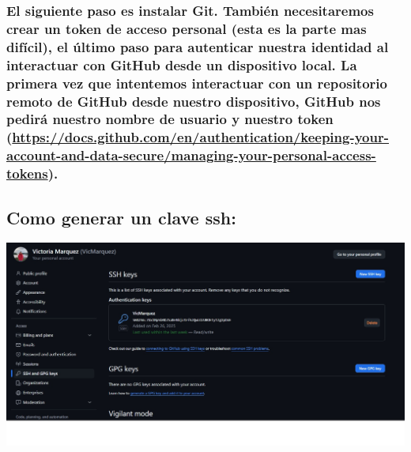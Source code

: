 \documentclass[
]{article}
\begin{document}
\subsubsection{\texorpdfstring{El siguiente paso es instalar Git.
También necesitaremos crear un token de acceso personal (esta es la
parte mas difícil), el último paso para autenticar nuestra identidad al
interactuar con GitHub desde un dispositivo local. La primera vez que
intentemos interactuar con un repositorio remoto de GitHub desde nuestro
dispositivo, GitHub nos pedirá nuestro nombre de usuario y nuestro token
(\url{https://docs.github.com/en/authentication/keeping-your-account-and-data-secure/managing-your-personal-access-tokens}).}{El siguiente paso es instalar Git. También necesitaremos crear un token de acceso personal (esta es la parte mas difícil), el último paso para autenticar nuestra identidad al interactuar con GitHub desde un dispositivo local. La primera vez que intentemos interactuar con un repositorio remoto de GitHub desde nuestro dispositivo, GitHub nos pedirá nuestro nombre de usuario y nuestro token (https://docs.github.com/en/authentication/keeping-your-account-and-data-secure/managing-your-personal-access-tokens).}}\label{el-siguiente-paso-es-instalar-git.-tambiuxe9n-necesitaremos-crear-un-token-de-acceso-personal-esta-es-la-parte-mas-difuxedcil-el-uxfaltimo-paso-para-autenticar-nuestra-identidad-al-interactuar-con-github-desde-un-dispositivo-local.-la-primera-vez-que-intentemos-interactuar-con-un-repositorio-remoto-de-github-desde-nuestro-dispositivo-github-nos-pediruxe1-nuestro-nombre-de-usuario-y-nuestro-token-httpsdocs.github.comenauthenticationkeeping-your-account-and-data-securemanaging-your-personal-access-tokens.}

\subsection{Como generar un clave ssh:}\label{como-generar-un-clave-ssh}

\includegraphics{key.jpg}
\end{document}
